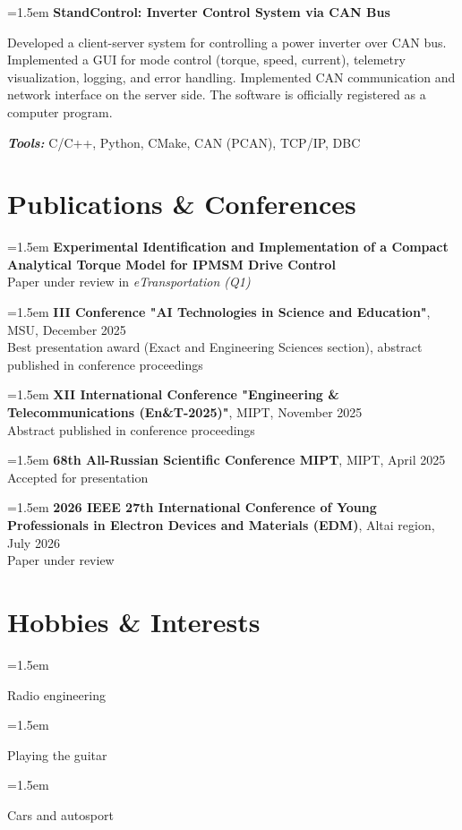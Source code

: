 \documentclass[12pt]{article}
\newcommand{\mainColor}{Blue} %
\newcommand{\shspace}{\hspace*{0.5em}}
\newcommand{\negshspace}{\hspace*{-0.5em}}
\newcommand{\negxvspace}{\vspace*{-0.2em}}
\newcommand{\neghvspace}{\vspace*{-1.5em}}
\newcommand{\svspace}{\vspace*{0.5em}}
\newcommand{\mvspace}{\vspace*{1em}}
\newcommand{\boxAwesome}[1]{
   \makebox[1.50em][c]{
      #1
   }
}
\newcommand{\cvsection}[2]{
    \section*{
        \color{\mainColor} \boxAwesome{#1} \negshspace #2
    }
}
\newcommand{\simpleSkill}[1]{
    \noindent\hangindent=1.5em\hangafter=0
    \faAngleRight
    \shspace
    #1
    \svspace
    \par
}
\newcommand{\hobby}[2]{
    \noindent\hangindent=1.5em\hangafter=0
    \faAngleRight
    \shspace
    \boxAwesome{#1} #2
    \svspace
    \par
}
\newcommand{\projectTitle}[1]{
    \noindent\hangindent=1.5em\hangafter=0
    \faAngleRight
    \shspace
    {\normalsize\textbf{#1}} \par
    \negxvspace
}
\newcommand{\projectDesc}[1]{
    {\small\linespread{1.05}\selectfont #1 \par}
    \negxvspace
}
\newcommand{\projectTools}[1]{
    \svspace
    {\small \textit{\textbf{Tools:}} #1 \par}
    \mvspace
    \svspace
}
\begin{document}
\projectTitle{StandControl: Inverter Control System via CAN Bus}
\projectDesc{Developed a client-server system for controlling a power inverter over CAN bus. Implemented a GUI for mode control (torque, speed, current), telemetry visualization, logging, and error handling.  Implemented CAN communication and network interface on the server side. The software is officially registered as a computer program.}
\projectTools{C/C++, Python, CMake, CAN (PCAN), TCP/IP, DBC}

\cvsection{\faBookOpen}{Publications \& Conferences}
\svspace

\simpleSkill{\textbf{Experimental Identification and Implementation of a Compact Analytical Torque Model for IPMSM Drive Control} \\
Paper under review in \textit{eTransportation (Q1)}}

\simpleSkill{\textbf{III Conference "AI Technologies in Science and Education"}, MSU, December 2025 \\
Best presentation award (Exact and Engineering Sciences section), abstract published in conference proceedings}

\simpleSkill{\textbf{XII International Conference "Engineering \& Telecommunications (En\&T-2025)"}, MIPT, November 2025 \\
Abstract published in conference proceedings}

\simpleSkill{\textbf{68th All-Russian Scientific Conference MIPT}, MIPT, April 2025 \\
Accepted for presentation}

\simpleSkill{\textbf{2026 IEEE 27th International Conference of Young Professionals in Electron Devices and Materials (EDM)}, Altai region, July 2026 \\
Paper under review}

    \neghvspace
    \svspace
    \svspace
    \cvsection{\faPuzzlePiece}{Hobbies \& Interests}
    \svspace

    \hobby{\faTv}{Radio engineering}
    \hobby{\faGuitar}{Playing the guitar}
    \hobby{\faCar}{Cars and autosport}
\end{document}
